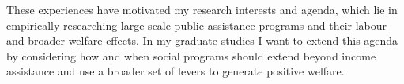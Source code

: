 These experiences have motivated my research interests and agenda, which lie in empirically researching large-scale public assistance programs and their labour and broader welfare effects. In my graduate studies I want to extend this agenda by considering how and when social programs should extend beyond income assistance and use a broader set of levers to generate positive welfare.
